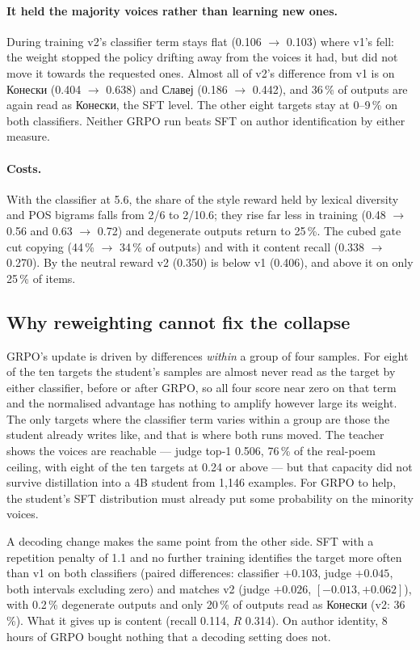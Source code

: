 \documentclass[11pt]{article}
\begin{document}
\paragraph{It held the majority voices rather than learning new ones.} During
training v2's classifier term stays flat (0.106 $\to$ 0.103) where v1's fell:
the weight stopped the policy drifting away from the voices it had, but did not
move it towards the requested ones. Almost all of v2's difference from v1 is
on Конески (0.404 $\to$ 0.638) and Славеј (0.186 $\to$ 0.442), and 36\,\% of
outputs are again read as Конески, the SFT level. The other eight targets stay
at 0--9\,\% on both classifiers. Neither GRPO run beats SFT on author
identification by either measure.

\paragraph{Costs.} With the classifier at 5.6, the share of the style reward
held by lexical diversity and POS bigrams falls from 2/6 to 2/10.6; they rise
far less in training (0.48 $\to$ 0.56 and 0.63 $\to$ 0.72) and degenerate
outputs return to 25\,\%. The cubed gate cut copying (44\,\% $\to$ 34\,\% of
outputs) and with it content recall (0.338 $\to$ 0.270). By the neutral reward
v2 (0.350) is below v1 (0.406), and above it on only 25\,\% of items.

\subsection{Why reweighting cannot fix the collapse}

GRPO's update is driven by differences \emph{within} a group of four samples.
For eight of the ten targets the student's samples are almost never read as
the target by either classifier, before or after GRPO, so all four score near
zero on that term and the normalised advantage has nothing to amplify however
large its weight. The only targets where the classifier term varies within a
group are those the student already writes like, and that is where both runs
moved. The teacher shows the voices are reachable --- judge top-1 0.506, 76\,\%
of the real-poem ceiling, with eight of the ten targets at 0.24 or above --- but that capacity
did not survive distillation into a 4B student from 1{,}146 examples. For GRPO
to help, the student's SFT distribution must already put some probability on
the minority voices.

A decoding change makes the same point from the other side. SFT with a
repetition penalty of 1.1 and no further training identifies the target more
often than v1 on both classifiers (paired differences: classifier $+0.103$,
judge $+0.045$, both intervals excluding zero) and matches v2 (judge $+0.026$,
$[-0.013, +0.062]$), with 0.2\,\% degenerate outputs and only 20\,\% of outputs
read as Конески (v2: 36\,\%). What it gives up is content (recall 0.114, $R$
0.314). On author identity, 8 hours of GRPO bought nothing that a decoding
setting does not.
\end{document}
